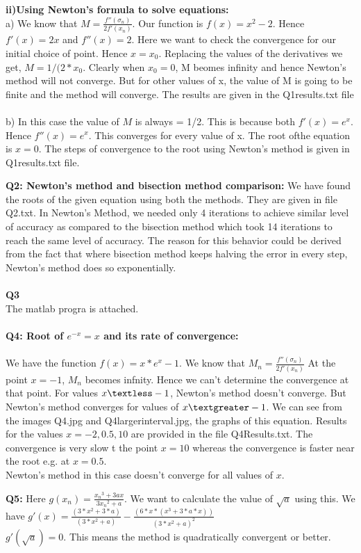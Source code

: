 \begin{enumerate}
{\bf ii)Using Newton's formula to solve equations:}\\
a) We know that $M = {\frac{f''({\sigma}_n)}{2f'(x_n )}}$. Our function is $f(x) = x^2 - 2$. Hence $f'(x) = 2x$ and $f''(x) = 2$. Here we want to check the convergence for our initial choice of point. Hence $x = x_0$. Replacing the values of the derivatives we get, $M = 1/(2*{x_0}$. Clearly when $x_0 = 0$, M beomes infinity and hence Newton's method will not converge. But for other values of x, the value of M is going to be finite and the method will converge.
The results are given in the Q1\textunderscore results.txt file\\ \\
b) In this case the value of $M$ is always = 1/2. This is because both $f'(x) = e^x$. Hence $f''(x) = e^x$. This converges for every value of x. The root ofthe equation is $x = 0$. The steps of convergence to the root using Newton's method is given in  Q1\textunderscore results.txt file.

{\bf Q2: Newton's method and bisection method comparison:} 
We have found the roots of the given equation using both the methods. They are given in file Q2.txt.
In Newton’s Method, we needed only 4 iterations to achieve similar level of accuracy as compared to the bisection method which took 14 iterations to reach the same level of accuracy.
The reason for this behavior could be derived from the fact that where bisection method keeps halving the error in every step, Newton’s method does so exponentially.
\\ \\
{\bf Q3}\\
The matlab progra is attached.\\
\\
{\bf Q4: Root of $e^{-x} = x$ and its rate of convergence:} \\ \\
We have the function $f(x) = x * {e^x} -  1$. We know that $M_n = {\frac{f''({\sigma}_n)}{2f'(x_n )}}$
At the point $x = -1$, $M_n$ becomes infnity. Hence we can't determine the convergence  at that point. For values $x \textless -1$, Newton's method doesn't converge. But Newton's method converges for values of $x \textgreater -1$. We can see from the images Q4.jpg and Q4\textunderscore larger\textunderscore interval.jpg, the graphs of this equation. Results for the values $x = -2, 0.5, 10$ are provided in the file Q4\textunderscore Results.txt. The convergence is very slow t the point $x = 10$ whereas the convergence is faster near the root e.g. at $x = 0.5$.\\
   Newton's method in this case doesn't converge for all values of $x$. 
   
{\bf Q5:} 
Here $g(x_n) = {\frac{{x_n}^3 + 3ax}{3{x_n}^2 +a}}$. We want to calculate the value of $\sqrt{a}$ using this. We have $g'(x) = {\frac{(3*{x^2} + 3*a)}{(3*{x^2} + a)}} - {\frac{(6*x*(x^3 + 3*a*x))}{{(3*x^2 + a)}^2}}$\\ 
$g'(\sqrt{a}) = 0$. This means the method is quadratically convergent or better.\\


\end{enumerate}

